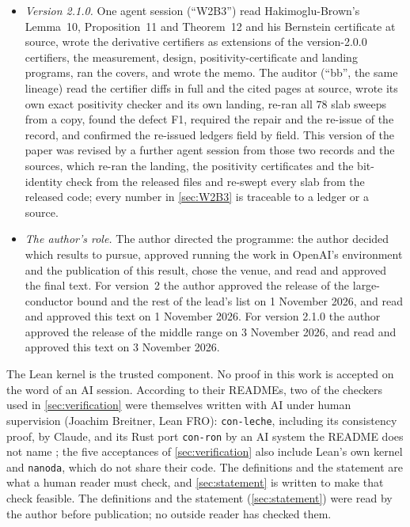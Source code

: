\documentclass[11pt]{article}
\theoremstyle{definition}
\newcommand{\lean}[1]{\texttt{#1}}
\begin{document}
\begin{itemize}
\item \emph{Version 2.1.0.} One agent session (``W2B3'') read Hakimoglu-Brown's Lemma~10, Proposition~11 and Theorem~12 and his Bernstein certificate at source, wrote the derivative certifiers as extensions of the version-2.0.0 certifiers, the measurement, design, positivity-certificate and landing programs, ran the covers, and wrote the memo. The auditor (``bb'', the same lineage) read the certifier diffs in full and the cited pages at source, wrote its own exact positivity checker and its own landing, re-ran all $78$ slab sweeps from a copy, found the defect F1, required the repair and the re-issue of the record, and confirmed the re-issued ledgers field by field. This version of the paper was revised by a further agent session from those two records and the sources, which re-ran the landing, the positivity certificates and the bit-identity check from the released files and re-swept every slab from the released code; every number in \cref{sec:W2B3} is traceable to a ledger or a source.
\item \emph{The author's role.} The author directed the programme: the author decided which results to pursue, approved running the work in OpenAI's environment and the publication of this result, chose the venue, and read and approved the final text. For version~2 the author approved the release of the large-conductor bound and the rest of the lead's list on 1 November 2026, and read and approved this text on 1 November 2026. For version 2.1.0 the author approved the release of the middle range on 3 November 2026, and read and approved this text on 3 November 2026.
\end{itemize}

\noindent
The Lean kernel is the trusted component. No proof in this work is accepted on the word of an AI session. According to their READMEs, two of the checkers used in \cref{sec:verification} were themselves written with AI under human supervision (Joachim Breitner, Lean FRO): \lean{con-leche}, including its consistency proof, by Claude, and its Rust port \lean{con-ron} by an AI system the README does not name \cite{conleche,conron}; the five acceptances of \cref{sec:verification} also include Lean's own kernel and \lean{nanoda}, which do not share their code. The definitions and the statement are what a human reader must check, and \cref{sec:statement} is written to make that check feasible. The definitions and the statement (\cref{sec:statement}) were read by the author before publication; no outside reader has checked them.
\end{document}
